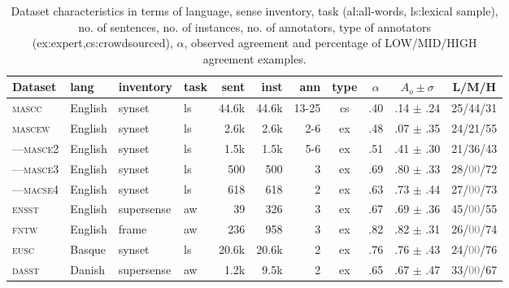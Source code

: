 \documentclass[11pt,a4paper]{article}
\begin{document}
\begin{table}[Ht!]

\begin{center}
  \begin{tabular}{llllrrrcccc}
  \toprule 

Dataset& lang & inventory & task & sent & inst & ann & type & $\alpha$ & $A_o\pm\sigma$ & L/M/H\\ 
\midrule 

\textsc{mascc} & English & synset & ls & 44.6k & 44.6k & 13-25 & cs & .40 & .14 $\pm$ .24 & 25/44/31\\
\textsc{mascew} & English & synset & ls & 2.6k & 2.6k & 2-6 & ex & .48 & .07 $\pm$ .35 & 24/21/55\\
---\textsc{masce2} & English & synset & ls & 1.5k & 1.5k & 5-6 & ex & .51 & .41 $\pm$ .30 & 21/36/43\\
---\textsc{masce3} & English & synset & ls & 500 & 500 & 3 & ex & .69 & .80 $\pm$ .33 & 28/\textcolor{gray}{00}/72\\
---\textsc{macse4} & English & synset & ls & 618 & 618 & 2 & ex & .63 & .73 $\pm$ .44 & 27/\textcolor{gray}{00}/73\\
\textsc{ensst} & English & supersense & aw & 39 & 326 & 3 & ex & .67 & .69 $\pm$ .36 & 45/\textcolor{gray}{00}/55\\
\textsc{fntw} & English & frame & aw & 236 & 958 & 3 & ex & .82 & .82 $\pm$ .31 & 26/\textcolor{gray}{00}/74\\

\textsc{eusc} & Basque & synset & ls & 20.6k & 20.6k & 2 & ex & .76 & .76 $\pm$ .43 & 24/\textcolor{gray}{00}/76\\
\textsc{dasst} & Danish & supersense & aw & 1.2k & 9.5k & 2 & ex & .65 & .67 $\pm$ .47 & 33/\textcolor{gray}{00}/67\\


\bottomrule

  \end{tabular}  
\end{center}
\caption{Dataset characteristics \label{tab:data} in terms of language, sense inventory, task (al:all-words, ls:lexical sample), no. of sentences, no. of instances, no. of annotators, type of annotators (ex:expert,cs:crowdsourced), $\alpha$, observed agreement and percentage of LOW/MID/HIGH agreement examples.}
\end{table} 
\end{document}
